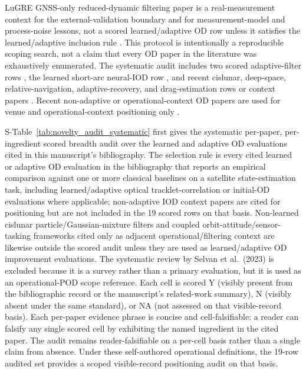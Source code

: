 \documentclass{article}
\begin{document}
LuGRE GNSS-only reduced-dynamic filtering paper is a real-measurement context for the external-validation boundary and for measurement-model and process-noise lessons, not a scored learned/adaptive OD row unless it satisfies the learned/adaptive inclusion rule \cite{cossu2026lugre}. This protocol is intentionally a reproducible scoping search, not a claim that every OD paper in the literature was exhaustively enumerated. The systematic audit includes two scored adaptive-filter rows \cite{gao2025heavytailed,sztamfater2026sequential}, the learned short-arc neural-IOD row \cite{zhu2026multiscale}, and recent cislunar, deep-space, relative-navigation, adaptive-recovery, and drag-estimation rows or context papers \cite{xu2026arckf,li2026delay,zhang2026hnn,chen2026orbitrecovery,lowe2026drag}. Recent non-adaptive or operational-context OD papers are used for venue and operational-context positioning only \cite{smego2026dynamic,heidrich2025collocation,song2026multiconstrainediod,cossu2026lugre,oliveira2026opticalflow,li2026islheterogeneous,liu2026epsa}.

S-Table~\ref{tab:novelty_audit_systematic} first gives the systematic per-paper, per-ingredient scored breadth audit over the learned and adaptive OD evaluations cited in this manuscript's bibliography. The selection rule is every cited learned or adaptive OD evaluation in the bibliography that reports an empirical comparison against one or more classical baselines on a satellite state-estimation task, including learned/adaptive optical tracklet-correlation or initial-OD evaluations where applicable; non-adaptive IOD context papers are cited for positioning but are not included in the 19 scored rows on that basis. Non-learned cislunar particle/Gaussian-mixture filters and coupled orbit-attitude/sensor-tasking frameworks cited only as adjacent operational/filtering context are likewise outside the scored audit unless they are used as learned/adaptive OD improvement evaluations. The systematic review by Selvan et al.\ (2023) is excluded because it is a survey rather than a primary evaluation, but it is used as an operational-POD scope reference. Each cell is scored Y (visibly present from the bibliographic record or the manuscript's related-work summary), N (visibly absent under the same standard), or NA (not assessed on that visible-record basis). Each per-paper evidence phrase is concise and cell-falsifiable: a reader can falsify any single scored cell by exhibiting the named ingredient in the cited paper. The audit remains reader-falsifiable on a per-cell basis rather than a single claim from absence. Under these self-authored operational definitions, the 19-row audited set provides a scoped visible-record positioning audit on that basis.

\end{document}
